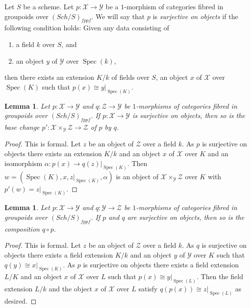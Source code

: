 \documentclass{stacks-project}
\theoremstyle{plain}
\newtheorem{lemma}[subsection]{Lemma}
\theoremstyle{definition}
\theoremstyle{remark}
\numberwithin{equation}{subsection}
\def\Spec{\mathop{\mathrm{Spec}}}
\def\Sch{\mathit{Sch}}
\begin{document}
\noindent
Let $S$ be a scheme. Let $p : \mathcal{X} \to \mathcal{Y}$ be a $1$-morphism
of categories fibred in groupoids over $(\Sch/S)_{fppf}$. We will say that
$p$ is {\it surjective on objects} if the following condition holds:
Given any data consisting of
\begin{enumerate}
\item a field $k$ over $S$, and
\item an object $y$ of $\mathcal{Y}$ over $\Spec(k)$,
\end{enumerate}
then there exists an extension $K/k$ of fields over $S$, an
object $x$ of $\mathcal{X}$ over $\Spec(K)$
such that $p(x) \cong y|_{\Spec(K)}$.

\begin{lemma}
\label{lemma-base-change-surjective}
Let $p : \mathcal{X} \to \mathcal{Y}$ and $q : \mathcal{Z} \to \mathcal{Y}$
be $1$-morphisms of categories fibred in groupoids over $(\Sch/S)_{fppf}$.
If $p : \mathcal{X} \to \mathcal{Y}$ is surjective on objects, then so
is the base change
$p' : \mathcal{X} \times_\mathcal{Y} \mathcal{Z} \to \mathcal{Z}$
of $p$ by $q$.
\end{lemma}

\begin{proof}
This is formal. Let $z$ be an object of $\mathcal{Z}$ over a field $k$.
As $p$ is surjective on objects there exists an extension $K/k$
and an object $x$ of $\mathcal{X}$ over $K$ and an isomorphism
$\alpha : p(x) \to q(z)|_{\Spec(K)}$. Then
$w = (\Spec(K), x, z|_{\Spec(K)}, \alpha)$ is an object of
$\mathcal{X} \times_\mathcal{Y} \mathcal{Z}$ over $K$ with
$p'(w) = z|_{\Spec(K)}$.
\end{proof}

\begin{lemma}
\label{lemma-composition-surjective}
Let $p : \mathcal{X} \to \mathcal{Y}$ and $q : \mathcal{Y} \to \mathcal{Z}$
be $1$-morphisms of categories fibred in groupoids over $(\Sch/S)_{fppf}$.
If $p$ and $q$ are surjective on objects, then so is the composition
$q \circ p$.
\end{lemma}

\begin{proof}
This is formal. Let $z$ be an object of $\mathcal{Z}$ over a field $k$.
As $q$ is surjective on objects there exists a field extension $K/k$
and an object $y$ of $\mathcal{Y}$ over $K$ such that
$q(y) \cong x|_{\Spec(K)}$. As $p$ is surjective on objects there
exists a field extension $L/K$ and an object $x$ of $\mathcal{X}$
over $L$ such that $p(x) \cong y|_{\Spec(L)}$. Then the field extension
$L/k$ and the object $x$ of $\mathcal{X}$ over $L$ satisfy
$q(p(x)) \cong z|_{\Spec(L)}$ as desired.
\end{proof}
\end{document}
